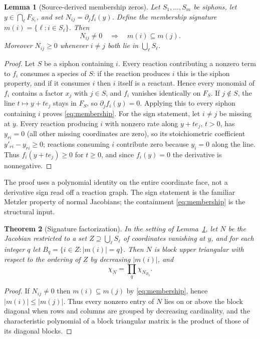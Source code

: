 \documentclass[11pt,a4paper]{article}
\theoremstyle{plain}
\newtheorem{theorem}{Theorem}[section]
\newtheorem{lemma}[theorem]{Lemma}
\theoremstyle{definition}
\theoremstyle{remark}
\newcommand{\ch}{\chi}
\begin{document}
\begin{lemma}[Source-derived membership zeros]\label{lem:membership}
Let $S_1,\ldots,S_m$ be siphons, let $y\in\bigcap_\ell F_{S_\ell}$, and set $N_{ij}=\partial_jf_i(y)$. Define the membership signature $m(i)=\{\ell:i\in S_\ell\}$. Then
\begin{equation}\label{eq:membership}
 N_{ij}\ne0\quad\Longrightarrow\quad m(i)\subseteq m(j).
\end{equation}
Moreover $N_{ij}\ge0$ whenever $i\ne j$ both lie in $\bigcup_\ell S_\ell$.
\end{lemma}
\begin{proof}
Let $S$ be a siphon containing $i$. Every reaction contributing a nonzero term to $f_i$ consumes a species of $S$: if the reaction produces $i$ this is the siphon property, and if it consumes $i$ then $i$ itself is a reactant. Hence every monomial of $f_i$ contains a factor $x_j$ with $j\in S$, and $f_i$ vanishes identically on $F_S$. If $j\notin S$, the line $t\mapsto y+te_j$ stays in $F_S$, so $\partial_jf_i(y)=0$. Applying this to every siphon containing $i$ proves \eqref{eq:membership}. For the sign statement, let $i\ne j$ be missing at $y$. Every reaction producing $i$ with nonzero rate along $y+te_j$, $t>0$, has $y_{ri}=0$ (all other missing coordinates are zero), so its stoichiometric coefficient $y'_{ri}-y_{ri}\ge0$; reactions consuming $i$ contribute zero because $y_i=0$ along the line. Thus $f_i(y+te_j)\ge0$ for $t\ge0$, and since $f_i(y)=0$ the derivative is nonnegative.
\end{proof}

The proof uses a polynomial identity on the entire coordinate face, not a derivative sign read off a reaction graph. The sign statement is the familiar Metzler property of normal Jacobians; the containment \eqref{eq:membership} is the structural input.

\begin{theorem}[Signature factorization]\label{thm:signature}
In the setting of Lemma~\ref{lem:membership}, let $N$ be the Jacobian restricted to a set $Z\supseteq\bigcup_\ell S_\ell$ of coordinates vanishing at $y$, and for each integer $q$ let $B_q=\{i\in Z:|m(i)|=q\}$. Then $N$ is block upper triangular with respect to the ordering of $Z$ by decreasing $|m(i)|$, and
\begin{equation}\label{eq:card-factor}
 \ch_N=\prod_{q}\ch_{N_{B_q}}.
\end{equation}
\end{theorem}
\begin{proof}
If $N_{ij}\ne0$ then $m(i)\subseteq m(j)$ by \eqref{eq:membership}, hence $|m(i)|\le|m(j)|$. Thus every nonzero entry of $N$ lies on or above the block diagonal when rows and columns are grouped by decreasing cardinality, and the characteristic polynomial of a block triangular matrix is the product of those of its diagonal blocks.
\end{proof}
\end{document}

